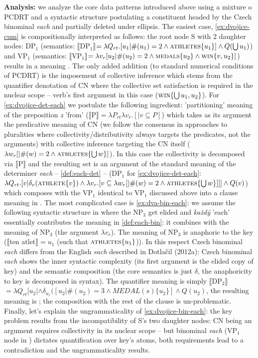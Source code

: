 \documentclass[12pt, a4paper]{scrartcl}
\newcommand{\lb}{\llbracket}
\newcommand{\rb}{\rrbracket}
\newcommand{\sx}[1]{$\lb${#1}$\rb$}
\begin{document}
\textbf{Analysis:} we analyze the core data patterns introduced above using a mixture o PCDRT and a syntactic structure postulating a constituent headed by the Czech binominal \textit{each} and partially deleted under ellipsis. The easiest case, \ref{ex:dvojice-cum} is compositionally interpreted as follows: the root node S with 2 daughter nodes: DP$_1$ (semantics: \sx{DP$_1$}$=\lambda Q_{rt}.[u_1| \#(u_1)=2 \wedge \textsc{athletes}\{u_1\}] \wedge Q(\bigcup u_1)$) and VP$_1$ (semantics:
 \sx{VP$_1$}$=\lambda v_r[u_2 | \#(u_2)=2 \wedge \textsc{medals}\{u_2\} \wedge \textsc{win}\{v,u_2\}]$) results in a meaning \NNext[a]. The only added addition (to standard numerical conditions of PCDRT) is the imposement of collective inference which stems from the quantifier denotation of CN where the collective set satisfaction is required in the nuclear scope -- verb's first argument in this case ($\textsc{win}\{\bigcup u_1,u_2\}$). For \ref{ex:dvojice-det-each} we postulate the following ingredient: 'partitioning' meaning of the preposition \textit{z} 'from' (\sx{P}${}=\lambda P_{rt}\lambda v_r.[| v\subseteq P]$) which takes as its argument the predicative meaning of CN (we follow the consensus in approaches to pluralities where collectivity/distributivity always targets the predicates, not the arguments) with collective inference targeting the CN itself ($\lambda w_r[|\#(w)=2 \wedge \textsc{athletes}\{\bigcup w\}]$). In this case the collectivity is decomposed via \sx{P} and the resulting set is an argument of the standard meaning of the determiner \textit{each} -- \ref{def:each-det} -- (DP$_1$ for \ref{ex:dvojice-det-each}: $\lambda Q_{rt}.[v|\delta_{v}(\textsc{athlete}\{v\}) \wedge \lambda v_r.[v \subseteq \lambda w_r[|\#(w)=2 \wedge \textsc{athletes}\{\bigcup w\}]]] \wedge Q(v)$) which composes with the VP$_1$ identical to VP$_1$ discussed above into a clause meaning in \NNext[b]. The most complicated case is \ref{ex:dva-bin-each}: we assume the following syntactic structure in \Next where the NP$_3$ get elided and \textit{každý} 'each' essentially contributes the meaning in \ref{def:each-bin}: it combines with the meaning of NP$_3$ (the argument $\lambda v_r$). The meaning of NP$_3$ is anaphoric to the key (\sx{ten atlet}${}=u_1$ (such that $\textsc{athletes}\{u_1\}$)). In this respect Czech binominal \textit{each} differs from the English \textit{each} described in Dotlačil (2012a): Czech binominal \textit{each} shows the inner syntactic complexity (its first argument is the elided copy of key) and the semantic composition (the core semantics is just $\delta$, the anaphoricity to key is decomposed in syntax). The quantifier meaning is simply \sx{DP$_2$}$=\lambda Q_{rt}[u_2 | \wedge \delta_{u_1}([u_2| \#(u_2)=3 \wedge MEDAL(s)\{u_2\}] \wedge Q(u_2)$, the resulting meaning is \NNext[c]; the composition with the rest of the clause is un-problematic. Finally, let's explain the ungrammaticality of \ref{ex:dvojice-bin-each}: the key problem results from the incompatibility of S's two daughter nodes: CN being an argument requires collectivity in its nuclear scope -- \NNext[d-i] but binominal \textit{each} (VP$_1$ node in \NNext[d-ii]) dictates quantification over key's atoms, both requirements lead to a contradiction and the ungrammaticality results.
\end{document}
